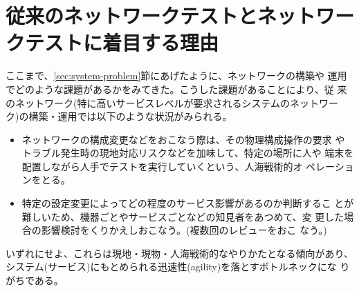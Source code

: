   \section{従来のネットワークテストとネットワークテストに着目する理由}


ここまで、\ref{sec:system-problem}節にあげたように、ネットワークの構築や
運用でどのような課題があるかをみてきた。こうした課題があることにより、従
来のネットワーク(特に高いサービスレベルが要求されるシステムのネットワー
ク)の構築・運用では以下のような状況がみられる。
\begin{itemize}
 \item ネットワークの構成変更などをおこなう際は、その物理構成操作の要求
       やトラブル発生時の現地対応リスクなどを加味して、特定の場所に人や
       端末を配置しながら人手でテストを実行していくという、人海戦術的オ
       ペレーションをとる。
 \item 特定の設定変更によってどの程度のサービス影響があるのか判断するこ
       とが難しいため、機器ごとやサービスごとなどの知見者をあつめて、変
       更した場合の影響検討をくりかえしおこなう。(複数回のレビューをおこ
       なう。)
\end{itemize}
いずれにせよ、これらは現地・現物・人海戦術的なやりかたとなる傾向があり、
システム(サービス)にもとめられる迅速性(agility)を落とすボトルネックにな
りがちである。


